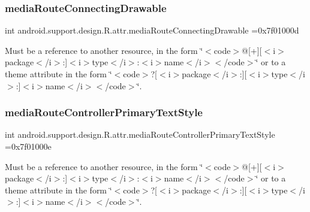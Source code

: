 \subsubsection{\texorpdfstring{media\+Route\+Connecting\+Drawable}{mediaRouteConnectingDrawable}}
{\footnotesize\ttfamily int android.\+support.\+design.\+R.\+attr.\+media\+Route\+Connecting\+Drawable =0x7f01000d\hspace{0.3cm}{\ttfamily [static]}}

Must be a reference to another resource, in the form \char`\"{}$<$code$>$@\mbox{[}+\mbox{]}\mbox{[}$<$i$>$package$<$/i$>$\+:\mbox{]}$<$i$>$type$<$/i$>$\+:$<$i$>$name$<$/i$>$$<$/code$>$\char`\"{} or to a theme attribute in the form \char`\"{}$<$code$>$?\mbox{[}$<$i$>$package$<$/i$>$\+:\mbox{]}\mbox{[}$<$i$>$type$<$/i$>$\+:\mbox{]}$<$i$>$name$<$/i$>$$<$/code$>$\char`\"{}. \mbox{\label{classandroid_1_1support_1_1design_1_1R_1_1attr_a91d44ac9a4618022f23575c15831be52}} 
\subsubsection{\texorpdfstring{media\+Route\+Controller\+Primary\+Text\+Style}{mediaRouteControllerPrimaryTextStyle}}
{\footnotesize\ttfamily int android.\+support.\+design.\+R.\+attr.\+media\+Route\+Controller\+Primary\+Text\+Style =0x7f01000e\hspace{0.3cm}{\ttfamily [static]}}

Must be a reference to another resource, in the form \char`\"{}$<$code$>$@\mbox{[}+\mbox{]}\mbox{[}$<$i$>$package$<$/i$>$\+:\mbox{]}$<$i$>$type$<$/i$>$\+:$<$i$>$name$<$/i$>$$<$/code$>$\char`\"{} or to a theme attribute in the form \char`\"{}$<$code$>$?\mbox{[}$<$i$>$package$<$/i$>$\+:\mbox{]}\mbox{[}$<$i$>$type$<$/i$>$\+:\mbox{]}$<$i$>$name$<$/i$>$$<$/code$>$\char`\"{}. \mbox{\label{classandroid_1_1support_1_1design_1_1R_1_1attr_a59d0d8f5380e3f68d1427ea6280fc3e2}} 
